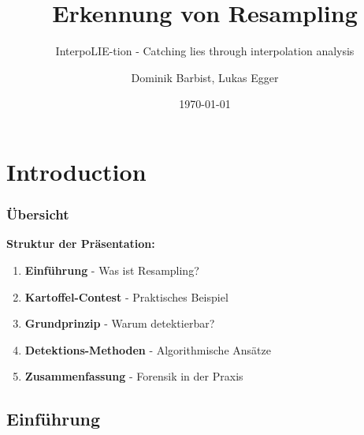 \documentclass[11pt,t,usepdftitle=false,aspectratio=169]{beamer}
\title[Erkennung von Resampling]{Erkennung von Resampling}
\subtitle{InterpoLIE-tion - Catching lies through interpolation analysis}
\author[Dominik Barbist, Lukas Egger]{Dominik Barbist, Lukas Egger \\ \vspace{0.5em}}
\date{\today}
\begin{document}
\section{Introduction}

\begin{frame}
	\frametitle{Übersicht}
	
	\textbf{Struktur der Präsentation:}
	
	\vspace{1.5em}
	
	\begin{enumerate}
		\setlength{\itemsep}{0.8em}
		\item \textbf{Einführung} - Was ist Resampling?
		\item \textbf{Kartoffel-Contest} - Praktisches Beispiel
		\item \textbf{Grundprinzip} - Warum detektierbar?
		\item \textbf{Detektions-Methoden} - Algorithmische Ansätze
		\item \textbf{Zusammenfassung} - Forensik in der Praxis
	\end{enumerate}
\end{frame}

\subsection{Einführung}
\end{document}

